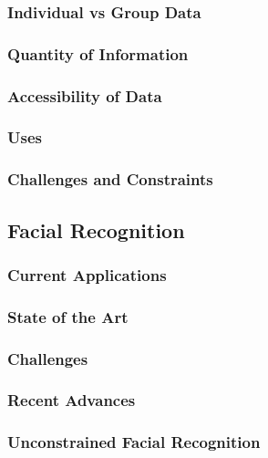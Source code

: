 \documentclass{article}
\begin{document}
\subsubsection{Individual vs Group Data}

\subsubsection{Quantity of Information}

\subsubsection{Accessibility of Data}

\subsubsection{Uses}

\subsubsection{Challenges and Constraints}





\subsection{Facial Recognition}
\subsubsection{Current Applications}

\subsubsection{State of the Art}	

\subsubsection{Challenges}

\subsubsection{Recent Advances}

\subsubsection{Unconstrained Facial Recognition}
\end{document}
